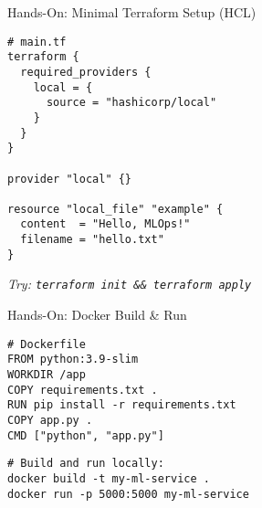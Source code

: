 \documentclass[aspectratio=169]{beamer}
\begin{document}
\begin{frame}{Hands-On: Minimal Terraform Setup (HCL)}
\begin{verbatim}
# main.tf
terraform {
  required_providers {
    local = {
      source = "hashicorp/local"
    }
  }
}

provider "local" {}

resource "local_file" "example" {
  content  = "Hello, MLOps!"
  filename = "hello.txt"
}
\end{verbatim}

\emph{Try: \texttt{terraform init \&\& terraform apply}}
\end{frame}

\begin{frame}{Hands-On: Docker Build \& Run}
\begin{verbatim}
# Dockerfile
FROM python:3.9-slim
WORKDIR /app
COPY requirements.txt .
RUN pip install -r requirements.txt
COPY app.py .
CMD ["python", "app.py"]
\end{verbatim}

\begin{verbatim}
# Build and run locally:
docker build -t my-ml-service .
docker run -p 5000:5000 my-ml-service
\end{verbatim}
\end{frame}
\end{document}
